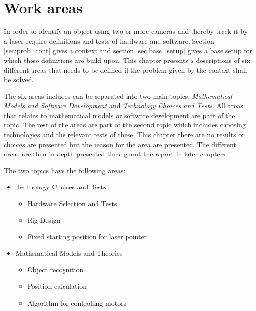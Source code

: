 \chapter{Work areas}
In order to identify an object using two or more cameras and thereby track it by a laser require definitions and tests of hardware and software. Section \ref{sec:prob_cont} gives a context and section \ref{sec:base_setup} gives a base setup for which these definitions are build upon. This chapter presents a descriptions of six different areas that needs to be defined if the problem given by the context shall be solved. 

The six areas includes can be separated into two main topics, \emph{Mathematical Models and Software Development} and \emph{Technology Choices and Tests}. All areas that relates to mathematical models or software development are part of the topic. The rest of the areas are part of the second topic which includes choosing technologies and the relevant tests of these. This chapter there are no results or choices are presented but the reason for the area are presented. The different areas are then in depth presented throughout the report in later chapters.

The two topics have the following areas:
\begin{itemize}
		\item Technology Choices and Tests
		\begin{itemize}
			\item Hardware Selection and Tests
			\item Rig Design
			\item Fixed starting position for laser pointer
		\end{itemize}
	  \item Mathematical Models and Theories
	  \begin{itemize}
	  	\item Object recognition
	  	\item Position calculation
	  	\item Algorithm for controlling motors
	  \end{itemize}
\end{itemize}